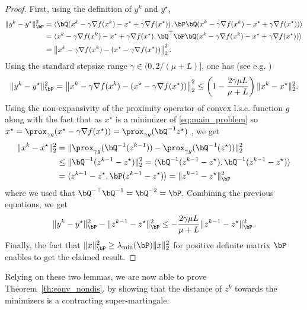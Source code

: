 \begin{proof}
First, using the definition of $y^k$ and $y^\star$,
\begin{align*}
  \|y^{k}-y^\star\|_{\bP}^2
   &=
   \langle \bQ(x^k - \gamma\nabla f(x^k) - x^\star + \gamma\nabla f(x^\star)), 
   \bP\bQ(x^k - \gamma\nabla f(x^k) - x^\star + \gamma\nabla f(x^\star)) \rangle\\
   &=
   \langle x^k - \gamma\nabla f(x^k) - x^\star + \gamma\nabla f(x^\star), \bQ^\top\bP\bQ (x^k - \gamma\nabla f(x^k) - x^\star + \gamma\nabla f(x^\star)) \rangle\\
   &= \left\| x^k - \gamma\nabla f(x^k) - ( x^\star - \gamma\nabla f(x^\star) ) \right\|_2^2.
\end{align*}
Using the standard stepsize range $\gamma\in(0,2/(\mu+L)]$, one has (see e.g. \cite[Lemma~3.11]{bubeck2015convex}) 
$$
 \|y^{k}-y^\star\|_{\bP}^2 = \left\| x^k - \gamma\nabla f(x^k) - ( x^\star - \gamma\nabla f(x^\star) ) \right\|_2^2 \leq \left(1 - \frac{2\gamma\mu L}{\mu + L}\right)\|x^k - x^\star\|_2^2.
$$
Using the non-expansivity of the proximity operator of convex l.s.c. function $g$ \cite[Prop. ~12.27]{bauschke2011convex} along with the fact that as $x^\star$ is a minimizer of \eqref{eq:main_problem} so $x^\star = \prox_{\gamma g}(x^\star - \gamma \nabla f(x^\star)) = \prox_{\gamma g}(\bQ^{-1}z^\star)$ \cite[Th. ~26.2]{bauschke2011convex}, we get
\begin{align*}
\|x^k - x^\star\|_2^2 &= \|\prox_{\gamma g}(\bQ^{-1}(z^{k-1})) - \prox_{\gamma g}(\bQ^{-1}(z^\star))\|_2^2\\
&\leq
\|\bQ^{-1}(z^{k-1} - z^\star)\|_2^2 = \langle \bQ^{-1}(z^{k-1} - z^\star),\bQ^{-1}(z^{k-1} - z^\star)\rangle \\
&= \langle z^{k-1} - z^\star,\bP(z^{k-1} - z^\star)\rangle =  \|z^{k-1}-z^\star\|_{\bP}^2
\end{align*}
where we used that $\bQ^{-\top}\bQ^{-1} = \bQ^{-2} = \bP$. Combining the previous equations, we get 
\begin{align*}
    \|y^{k}-y^\star\|_{\bP}^2 -  \|z^{k-1}-z^\star\|_{\bP}^2 \leq- \frac{2\gamma\mu L}{\mu + L} \|z^{k-1} - z^\star\|_{\bP}^2.
\end{align*}
Finally, the fact that $\|x\|_{\bP}^2 \geq \lambda_{\min}(\bP)\|x\|_2^2$ for positive definite matrix $\bP$ enables to get the claimed result.
\end{proof}


Relying on these two lemmas, we are now able to prove Theorem~\ref{th:conv_nondis}.
by showing that the distance of $z^k$ towards the minimizers is a contracting super-martingale. %

